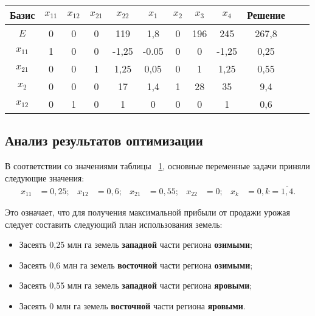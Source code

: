 \begin{table}[h]
  \centering
    \caption{\label{tbl:Simplex2_3}}
    \begin{tabular}{|c|c|c|c|c|c|c|c|c|c|c|c|}
      \hline
      Базис & $ x_{11} $ & $ x_{12} $ & $ x_{21} $ & $ x_{22} $ & $ x_{1} $ & $ x_{2} $ & $ x_{3} $ & $ x_{4} $ & Решение \\  
      \hline
      $ E $ & 0 & 0 & 0 & 119 & 1{,}8 & 0 & 196 & 245 & 267{,}8 \\  
      \hline
      $ x_{11} $ & 1 & 0 & 0 & -1{,}25 & -0.05 & 0 & 0 & -1{,}25 & 0{,}25 \\  
      \hline
      $ x_{21} $ & 0 & 0 & 1 & 1{,}25 & 0{,}05 & 0 & 1 & 1{,}25 & 0{,}55 \\  
      \hline
      $ x_{2} $ & 0 & 0 & 0 & 17 & 1{,}4 & 1 & 28 & 35 & 9{,}4 \\  
      \hline
      $ x_{12} $ & 0 & 1 & 0 & 1 & 0 & 0 & 0 & 1 & 0{,}6 \\  
      \hline
    \end{tabular}
\end{table}

\subsection{Анализ результатов оптимизации}

В соответствии со значениями таблицы ~\ref{tbl:Simplex2_3}, основные переменные
задачи приняли следующие значения:
\begin{equation}
  \label{eq:Solution}
    \begin{aligned}
      x_{11} &= 0{,}25; &
      x_{12} &= 0{,}6; &
      x_{21} &= 0{,}55; &
      x_{22} &= 0; &
      x_{k} &= 0, k=\overline{1,4}.
    \end{aligned}
\end{equation}

Это означает, что для получения максимальной прибыли от продажи урожая следует
составить следующий план использования земель:
\begin{itemize}
\item Засеять 0{,}25 млн га земель \textbf{западной} части региона \textbf{озимыми};
\item Засеять 0{,}6 млн га земель \textbf{восточной} части региона \textbf{озимыми};
\item Засеять 0{,}55 млн га земель \textbf{западной} части региона \textbf{яровыми};
\item Засеять 0 млн га земель \textbf{восточной} части региона \textbf{яровыми}.
\end{itemize}

